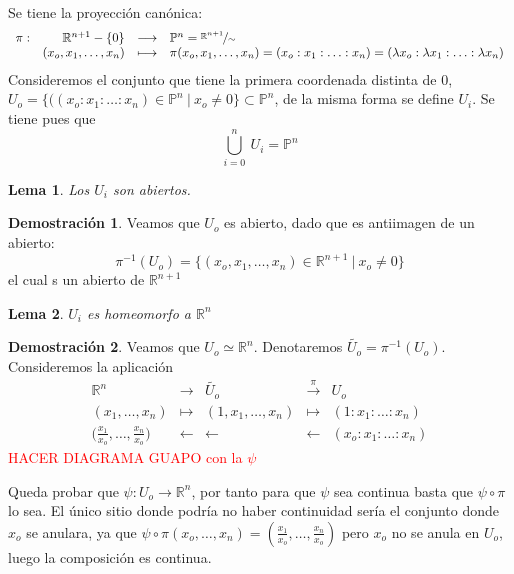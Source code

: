 \documentclass[12pt,twoside]{report}
\theoremstyle{azul}
\theoremstyle{azul2}
\theoremstyle{plain}
\newtheorem*{lem}{Lema}
\theoremstyle{definition}
\newtheorem*{dem}{Demostración}
\theoremstyle{remark}
\begin{document}
      Se tiene la proyección canónica:
      $$\begin{array}{rrcl}
           \pi: & \mathbb{R}^{n+1}-\{0\} & \longrightarrow & \mathbb{P}^n = \nicefrac{\mathbb{R}^{n+1}}{\sim}  \\
           & (x_o, x_1, \ldots, x_n) & \longmapsto & \pi(x_o, x_1, \ldots, x_n) = (x_o: x_1: \ldots: x_n)=(\lambda x_o: \lambda x_1: \ldots: \lambda x_n)
      \end{array}$$
      Consideremos el conjunto que tiene la primera coordenada distinta de 0, $U_o=\{((x_o: x_1: \ldots: x_n) \in \mathbb{P}^n \: | \: x_o \neq 0\} \subset \mathbb{P}^n$, de la misma forma se define $U_i$. Se tiene pues que $$\underset{i=0}{\overset{n}{\bigcup}} \: U_i = \mathbb{P}^n$$
      \begin{lem}
          Los $U_i$ son abiertos.
      \end{lem}
      \begin{dem}
         Veamos que $U_o$ es abierto, dado que es antiimagen de un abierto:
         $$\pi^{-1}(U_o)=\{(x_o, x_1, \ldots, x_n) \in \mathbb{R}^{n+1} \: | \: x_o \neq 0\}$$
         el cual s un abierto de $\mathbb{R}^{n+1}$
      \end{dem}
      \begin{lem}
         $U_i$ es homeomorfo a $\mathbb{R}^n$ 
      \end{lem}
      \begin{dem}
          Veamos que $U_o \simeq \mathbb{R}^n$. Denotaremos $\tilde{U_o}=\pi^{-1}(U_o)$. Consideremos la aplicación
          $$\begin{array}{rrcll}
              \mathbb{R}^n & \longrightarrow & \tilde{U_o} & \overset{\pi}{\longrightarrow} & U_o \\
               (x_1, \ldots, x_n) & \longmapsto & (1, x_1, \ldots, x_n) & \longmapsto & (1: x_1: \ldots: x_n) \\
               \big(\frac{x_1}{x_o}, \ldots, \frac{x_n}{x_o}\big) & \longleftarrow & \longleftarrow & \longleftarrow & (x_o: x_1: \ldots: x_n)
          \end{array}$$
          \textcolor{red}{HACER DIAGRAMA GUAPO con la $\psi$}
          
          Queda probar que $\psi: U_o \longrightarrow \mathbb{R}^n$, por tanto para que $\psi$ sea continua basta que $\psi \circ \pi$ lo sea. El único sitio donde podría no haber continuidad sería el conjunto donde $x_o$ se anulara, ya que $\psi \circ \pi(x_o, \ldots, x_n)=(\frac{x_1}{x_o}, \ldots, \frac{x_n}{x_o})$ pero $x_o$ no se anula en $U_o$, luego la composición es continua.     
          \end{dem}
\end{document}
